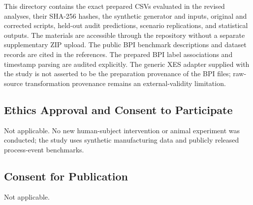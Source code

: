\documentclass[pdflatex,iicol,Numbered,sn-basic]{sn-jnl}
\begin{document}
This directory contains the exact prepared CSVs evaluated in the revised analyses, their SHA-256 hashes, the synthetic generator and inputs, original and corrected scripts, held-out audit predictions, scenario replications, and statistical outputs. The materials are accessible through the repository without a separate supplementary ZIP upload. The public BPI benchmark descriptions and dataset records are cited in the references. The prepared BPI label associations and timestamp parsing are audited explicitly. The generic XES adapter supplied with the study is not asserted to be the preparation provenance of the BPI files; raw-source transformation provenance remains an external-validity limitation.

\subsection*{Ethics Approval and Consent to Participate}
Not applicable. No new human-subject intervention or animal experiment was conducted;
the study uses synthetic manufacturing data and publicly released
process-event benchmarks.

\subsection*{Consent for Publication}
Not applicable.


\end{document}

